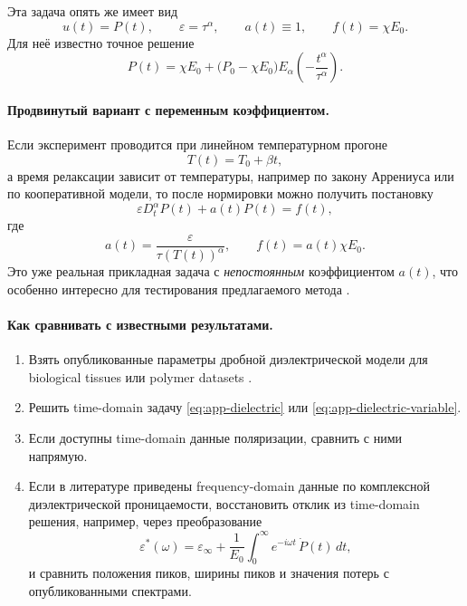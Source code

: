 \documentclass[12pt,a4paper]{article}
\theoremstyle{definition}
\newcommand{\eps}{\varepsilon}
\begin{document}
Эта задача опять же имеет вид
\[
u(t)=P(t),
\qquad
\eps=\tau^\alpha,
\qquad
a(t)\equiv1,
\qquad
f(t)=\chi E_0.
\]
Для неё известно точное решение
\begin{equation}
\label{eq:app-dielectric-exact}
P(t)=\chi E_0 + \bigl(P_0-\chi E_0\bigr)
E_\alpha\!\left(-\frac{t^\alpha}{\tau^\alpha}\right).
\end{equation}

\paragraph{Продвинутый вариант с переменным коэффициентом.}
Если эксперимент проводится при линейном температурном прогоне
\[
T(t)=T_0+\beta t,
\]
а время релаксации зависит от температуры, например по закону Аррениуса
или по кооперативной модели, то после нормировки можно получить постановку
\begin{equation}
\label{eq:app-dielectric-variable}
\eps D_t^\alpha P(t)+a(t)P(t)=f(t),
\end{equation}
где
\[
a(t)=\frac{\eps}{\tau(T(t))^\alpha},
\qquad
f(t)=a(t)\chi E_0.
\]
Это уже реальная прикладная задача с \emph{непостоянным} коэффициентом $a(t)$,
что особенно интересно для тестирования предлагаемого метода
\cite{renteria2025polymer}.

\paragraph{Как сравнивать с известными результатами.}
\begin{enumerate}[label=\textup{(\alph*)}]
\item Взять опубликованные параметры дробной диэлектрической модели
для biological tissues или polymer datasets \cite{ciancio2017dielectric,renteria2025polymer}.
\item Решить time-domain задачу \eqref{eq:app-dielectric}
или \eqref{eq:app-dielectric-variable}.
\item Если доступны time-domain данные поляризации, сравнить с ними напрямую.
\item Если в литературе приведены frequency-domain данные по комплексной
диэлектрической проницаемости, восстановить отклик из time-domain решения, например,
через преобразование
\begin{equation}
\label{eq:app-dielectric-fourier}
\varepsilon^\ast(\omega)
=
\varepsilon_\infty
+
\frac{1}{E_0}
\int_0^\infty e^{-i\omega t}\,\dot P(t)\,dt,
\end{equation}
и сравнить положения пиков, ширины пиков и значения потерь
с опубликованными спектрами.
\end{enumerate}
\end{document}
